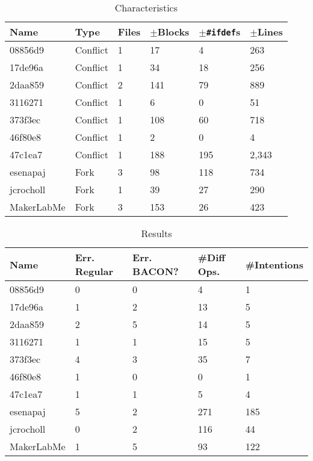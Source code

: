 \begin{table}[h]
    \centering
    \caption{Characteristics}
    \label{tab:internalchar}
    \begin{tabular}{lll|lll}
\hline\hline
\textbf{Name} & \textbf{Type} & \textbf{Files} & \textbf{$\pm$Blocks} & \textbf{$\pm$\texttt{\#ifdef}s} & \textbf{$\pm$Lines} \\
\hline
08856d9      & Conflict     & 1 & 17    & 4     & 263   \\
17de96a      & Conflict     & 1 & 34    & 18    & 256   \\
2daa859      & Conflict     & 2 & 141 & 79      & 889   \\
3116271      & Conflict     & 1 & 6     & 0     & 51    \\
373f3ec      & Conflict     & 1 & 108 & 60      & 718   \\
46f80e8      & Conflict     & 1 & 2     & 0     & 4     \\
47c1ea7      & Conflict     & 1 & 188   & 195   & 2,343 \\
\hline
esenapaj     & Fork         & 3 & 98    & 118   & 734   \\
jcrocholl    & Fork         & 1 & 39    & 27    & 290   \\
MakerLabMe   & Fork         & 3 & 153   & 26    & 423   \\
\hline\hline
    \end{tabular}
\end{table}

\begin{table}[h]
    \centering
    \caption{Results}
    \label{tab:internalres}
    \begin{tabular}{l|llll}
\hline\hline
\textbf{Name} & \textbf{Err. Regular} & \textbf{Err. BACON?} & \textbf{\#Diff Ops.} & \textbf{\#Intentions}\\
\hline
08856d9      & 0     & 0     & 4     & 1     \\
17de96a      & 1     & 2     & 13    & 5     \\
2daa859      & 2     & 5     & 14    & 5     \\
3116271      & 1     & 1     & 15    & 5     \\
373f3ec      & 4     & 3     & 35    & 7     \\
46f80e8      & 1     & 0     & 0     & 1     \\
47c1ea7      & 1     & 1     & 5     & 4     \\
\hline
esenapaj     & 5     & 2     & 271   & 185   \\ %
jcrocholl    & 0     & 2     & 116   & 44    \\
MakerLabMe   & 1     & 5     & 93    & 122   \\ %
\hline\hline
    \end{tabular}
\end{table}

